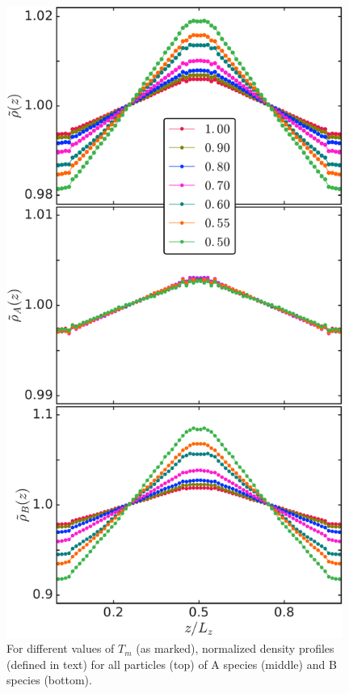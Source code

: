 \begin{figure}[hbt!]
	\includegraphics[width=11cm]{figs/fig3p4.pdf}
	\centering
	\caption[{\em Total density and partial densities profiles at different mean temperatures}]{For different values of $T_m$ (as marked), normalized density profiles (defined in text) for all particles (top) of A species (middle) and B species (bottom). \label{fig3p4}}
\end{figure}

